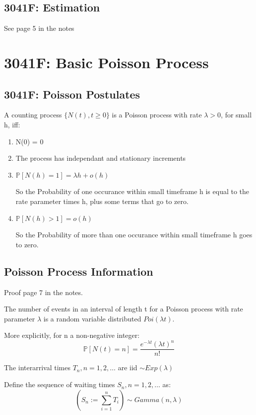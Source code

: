 \documentclass[12pt]{article}
\begin{document}
    \subsection{3041F: Estimation}
    See page 5 in the notes
\section{3041F: Basic Poisson Process}
    \subsection{3041F: Poisson Postulates}
    A counting process \(\{N(t), t \ge 0\}\) is a Poisson process with rate 
    \( \lambda > 0 \), for small h, iff:
    \begin{enumerate}
        \item N(0) = 0
        \item The process has independant and stationary increments
        \item \(\mathbb{P}[N(h) = 1] = \lambda h + o(h)\)

            So the Probability of one occurance within small timeframe h is equal to the rate parameter times h, plus some terms that go to zero.
        \item \(\mathbb{P}[N(h) > 1] = o(h)\)

            So the Probability of more than one occurance within small timeframe h goes to zero.
    \end{enumerate}

    \subsection{Poisson Process Information}
    Proof page 7 in the notes.

    The number of events in an interval of length t for a Poisson process with 
    rate parameter \(\lambda\) is a random variable distributed \(Poi(\lambda t)\).

    More explicitly, for n a non-negative integer:
    \begin{equation*}
        \mathbb{P}[N(t) = n] = \frac{e^{-\lambda t}(\lambda t)^n}{n!}
    \end{equation*}

    The interarrival times \({T_n, n=1, 2, \dots}\) are iid \(\sim Exp(\lambda)\)

    Define the sequence of waiting times \({S_n, n=1, 2, \dots}\) as: 
    \begin{equation*}
        \left(S_n := \sum_{i=1}^n T_i\right) \sim Gamma(n, \lambda)
    \end{equation*}
\end{document}
